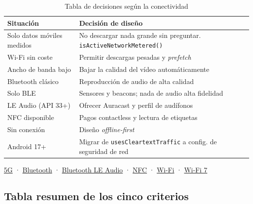 \documentclass[11pt,a4paper]{article}
\newcommand{\code}[1]{\texttt{\color{ink}#1}}
\begin{document}
	\begin{table}[htbp]
		\centering
		\small
		\begin{tabularx}{\textwidth}{@{}>{\RaggedRight\arraybackslash}p{5cm} >{\RaggedRight\arraybackslash}X@{}}
			\toprule
			\rowcolor{primary}
			\textcolor{paper}{\sffamily\bfseries Situación} & \textcolor{paper}{\sffamily\bfseries Decisión de diseño} \\
			\midrule
			Solo datos móviles medidos & No descargar nada grande sin preguntar. \code{isActiveNetworkMetered()} \\
			\rowcolor{soft}
			Wi-Fi sin coste & Permitir descargas pesadas y \emph{prefetch} \\
			Ancho de banda bajo & Bajar la calidad del vídeo automáticamente \\
			\rowcolor{soft}
			Bluetooth clásico & Reproducción de audio de alta calidad \\
			Solo BLE & Sensores y beacons; nada de audio alta fidelidad \\
			\rowcolor{soft}
			LE Audio (API 33+) & Ofrecer Auracast y perfil de audífonos \\
			NFC disponible & Pagos contactless y lectura de etiquetas \\
			\rowcolor{soft}
			Sin conexión & Diseño \emph{offline-first} \\
			Android 17+ & Migrar de \code{usesCleartextTraffic} a config. de seguridad de red \\
			\bottomrule
		\end{tabularx}
		\caption{Tabla de decisiones según la conectividad}
	\end{table}
	
	\begin{fuentesbox}
		\href{https://developer.android.com/develop/connectivity/5g}{5G} ·
		\href{https://developer.android.com/develop/connectivity/bluetooth}{Bluetooth} ·
		\href{https://developer.android.com/develop/connectivity/bluetooth/ble-audio/overview}{Bluetooth LE Audio} ·
		\href{https://developer.android.com/develop/connectivity/nfc}{NFC} ·
		\href{https://developer.android.com/develop/connectivity/wifi}{Wi-Fi} ·
		\href{https://source.android.com/docs/core/connect/wifi-7}{Wi-Fi 7}
	\end{fuentesbox}
	
	\subsection{Tabla resumen de los cinco criterios}
	
\end{document}
